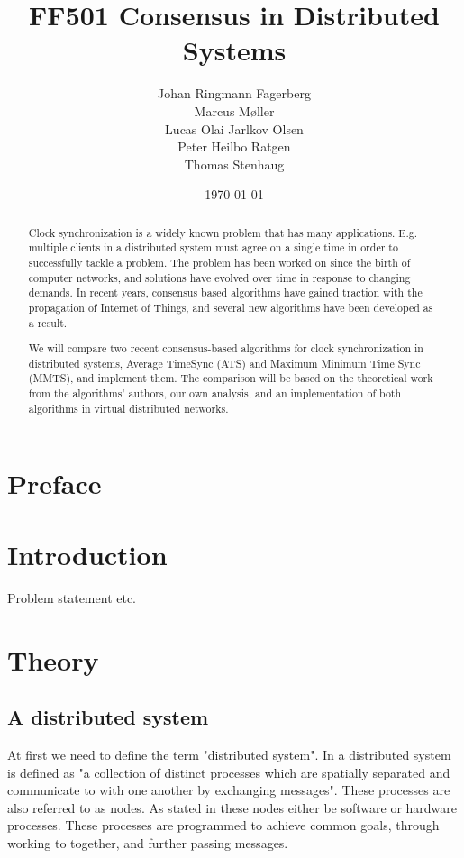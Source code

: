 \documentclass[a4paper,12pt]{article}
\date{\today}
\title{FF501 Consensus in Distributed Systems}
\author{
  Johan Ringmann Fagerberg \\
  Marcus Møller \\
  Lucas Olai Jarlkov Olsen \\
  Peter Heilbo Ratgen \\
  Thomas Stenhaug
}
\begin{document}
\maketitle

\begin{abstract}

Clock synchronization is a widely known problem that has many applications. E.g. multiple clients in a distributed system must agree on a single time in order to successfully tackle a problem. The problem has been worked on since the birth of computer networks, and solutions have evolved over time in response to changing demands. In recent years, consensus based algorithms have gained traction with the propagation of Internet of Things, and several new algorithms have been developed as a result.

We will compare two recent consensus-based algorithms for clock synchronization in distributed systems, Average TimeSync (ATS) and Maximum Minimum Time Sync (MMTS), and implement them. The comparison will be based on the theoretical work from the algorithms' authors, our own analysis, and an implementation of both algorithms in virtual distributed networks.
\end{abstract}

\clearpage
\tableofcontents
\clearpage

\setcounter{page}{1}

\section{Preface}

\section{Introduction}

Problem statement etc.

\section{Theory}

\subsection{A distributed system}

At first we need to define the term "distributed system". In \cite{Lamport78} a distributed system is defined as "a collection of distinct processes which are spatially separated and communicate to with one another by exchanging messages". These processes are also referred to as nodes. As stated in \cite{TanenbaumSteen06} these nodes either be software or hardware processes. These processes are programmed to achieve common goals, through working to together, and further passing messages. 
\end{document}
